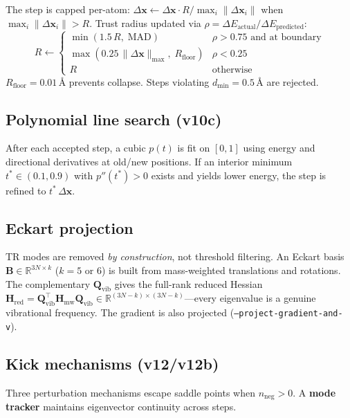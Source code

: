 \documentclass[11pt,a4paper]{article}
\newcommand{\vect}[1]{\bm{#1}}
\newcommand{\mat}[1]{\mathbf{#1}}
\newcommand{\norm}[1]{\lVert #1 \rVert}
\theoremstyle{definition}
\begin{document}
The step is capped per-atom:
$\Delta\vect{x} \leftarrow \Delta\vect{x} \cdot R / \max_i\norm{\Delta\vect{x}_i}$
when $\max_i\norm{\Delta\vect{x}_i} > R$.  Trust radius updated via
$\rho = \Delta E_\text{actual} / \Delta E_\text{predicted}$:
\begin{equation}
  R \leftarrow \begin{cases}
    \min(1.5\,R,\;\text{MAD}) & \rho > 0.75 \text{ and at boundary} \\
    \max(0.25\,\norm{\Delta\vect{x}}_\text{max},\;R_\text{floor}) & \rho < 0.25 \\
    R & \text{otherwise}
  \end{cases}
\end{equation}
$R_\text{floor} = 0.01$\,\AA{} prevents collapse.  Steps violating
$d_\text{min} = 0.5$\,\AA{} are rejected.

\subsection{Polynomial line search (v10c)}

After each accepted step, a cubic $p(t)$ is fit on $[0,1]$ using energy and
directional derivatives at old/new positions.  If an interior minimum
$t^* \in (0.1, 0.9)$ with $p''(t^*) > 0$ exists and yields lower energy,
the step is refined to $t^*\,\Delta\vect{x}$.

\subsection{Eckart projection}
\label{app:eckart}

TR modes are removed \emph{by construction}, not threshold filtering.
An Eckart basis $\mat{B} \in \mathbb{R}^{3N \times k}$ ($k=5$ or $6$) is
built from mass-weighted translations and rotations.  The complementary
$\mat{Q}_\text{vib}$ gives the full-rank reduced Hessian
$\mat{H}_\text{red} = \mat{Q}_\text{vib}^\top \mat{H}_\text{mw} \mat{Q}_\text{vib}
\in \mathbb{R}^{(3N-k) \times (3N-k)}$---every eigenvalue is a genuine
vibrational frequency.  The gradient is also projected
(\texttt{--project-gradient-and-v}).

\subsection{Kick mechanisms (v12/v12b)}

Three perturbation mechanisms escape saddle points when $n_\text{neg} > 0$.
A \textbf{mode tracker} maintains eigenvector continuity across steps.
\end{document}
